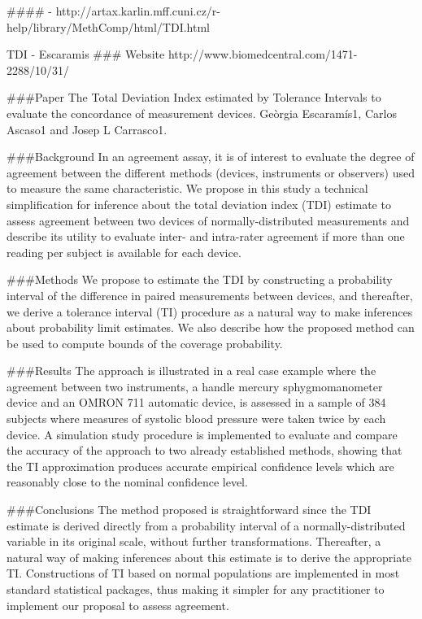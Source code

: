 \documentclass[MAIN.tex]{subfiles}
\begin{document}
####
- http://artax.karlin.mff.cuni.cz/r-help/library/MethComp/html/TDI.html

\newpage
TDI - Escaramis
### Website
http://www.biomedcentral.com/1471-2288/10/31/

###Paper
The Total Deviation Index estimated by Tolerance Intervals to evaluate the concordance of measurement devices.  
Geòrgia Escaramís1, Carlos Ascaso1 and Josep L Carrasco1.  

###Background
In an agreement assay, it is of interest to evaluate the degree of agreement between the different methods (devices, instruments or observers) used to measure the same characteristic. We propose in this study a technical simplification for inference about the total deviation index (TDI) estimate to assess agreement between two devices of normally-distributed measurements and describe its utility to evaluate inter- and intra-rater agreement if more than one reading per subject is available for each device.

###Methods
We propose to estimate the TDI by constructing a probability interval of the difference in paired measurements between devices, and thereafter, we derive a tolerance interval (TI) procedure as a natural way to make inferences about probability limit estimates. We also describe how the proposed method can be used to compute bounds of the coverage probability.

###Results
The approach is illustrated in a real case example where the agreement between two instruments, a handle mercury sphygmomanometer device and an OMRON 711 automatic device, is assessed in a sample of 384 subjects where measures of systolic blood pressure were taken twice by each device. A simulation study procedure is implemented to evaluate and compare the accuracy of the approach to two already established methods, showing that the TI approximation produces accurate empirical confidence levels which are reasonably close to the nominal confidence level.

###Conclusions
The method proposed is straightforward since the TDI estimate is derived directly from a probability interval of a normally-distributed variable in its original scale, without further transformations. Thereafter, a natural way of making inferences about this estimate is to derive the appropriate TI. Constructions of TI based on normal populations are implemented in most standard statistical packages, thus making it simpler for any practitioner to implement our proposal to assess agreement.
\newpage
	
\end{document}
